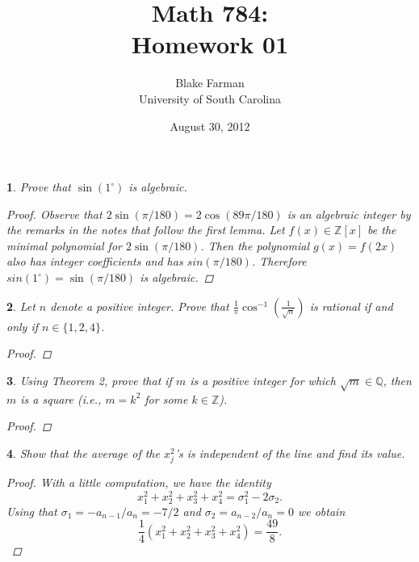 \documentclass[10pt]{amsart}
\author{Blake Farman\\University of South Carolina}
\title{Math 784:\\Homework 01}
\date{August 30, 2012}
\begin{document}
\maketitle

\newtheorem{thm}{}

\begin{thm}
	Prove that $\sin(1^\circ)$ is algebraic.
	\begin{proof}
	Observe that $2\sin(\pi/180) = 2\cos(89\pi/180)$ is an algebraic integer by the remarks in the notes that follow the first lemma.
	Let $f(x) \in \mathbb{Z}[x]$ be the minimal polynomial for $2\sin(\pi/180)$.
	Then the polynomial $g(x) = f(2x)$ also has integer coefficients and has $sin(\pi/180)$.
	Therefore $sin(1^\circ) = \sin(\pi/180)$ is algebraic.
	\end{proof}
\end{thm}

\begin{thm}
	Let $n$ denote a positive integer.  
	Prove that $\displaystyle{\frac{1}{\pi}\cos^{-1}\left(\frac{1}{\sqrt{n}}\right)}$ is rational if and only if $n \in \{1,2,4\}$.
	\begin{proof}
	\end{proof}
\end{thm}

\begin{thm}
	Using Theorem 2, prove that if $m$ is a positive integer for which $\sqrt{m} \in \mathbb{Q}$, then $m$ is a square (i.e., $m = k^2$ for some $k \in \mathbb{Z}$).
	\begin{proof}
	\end{proof}
\end{thm}

\begin{thm}
	Show that the average of the $x_j^2$'s is independent of the line and find its value.
	\begin{proof}
	With a little computation, we have the identity $$x_1^2 + x_2^2 + x_3^2 + x_4^2 = \sigma_1^2 - 2\sigma_2.$$
	Using that $\sigma_1 = -a_{n-1}/a_n = -7/2$ and $\sigma_2 = a_{n-2}/a_n = 0$ we obtain $$\frac{1}{4}(x_1^2 + x_2^2 + x_3^2 + x_4^2) = \frac{49}{8}.$$
	\end{proof}
\end{thm}
\end{document}
